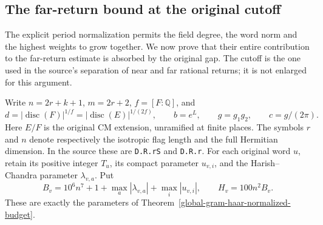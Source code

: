 \subsection{The far-return bound at the original cutoff}
\label{global-gram-far-absorption-section}

The explicit period normalization permits the field degree, the word
norm and the highest weights to grow together.  We now prove that their
entire contribution to the far-return estimate is absorbed by the
original gap.  The cutoff is the one used in the source's separation
of near and far rational returns; it is not enlarged for this argument.

Write $n=2r+k+1$, $m=2r+2$, $f=[F:\mathbb Q]$, and
\[
 d=|\operatorname{disc}(F)|^{1/f}
   =|\operatorname{disc}(E)|^{1/(2f)},\qquad
 b=e^L,\qquad g=g_1g_2,\qquad c=g/(2\pi).
\]
Here $E/F$ is the original CM extension, unramified at finite places.
The symbols $r$ and $n$ denote respectively the isotropic flag length
and the full Hermitian dimension.  In the source these are
\texttt{D.R.rS} and \texttt{D.R.r}.  For each original word $u$,
retain its positive integer $T_u$, its compact parameter $u_{v,i}$,
and the Harish--Chandra parameter $\lambda_{v,a}$.  Put
\[
 B_v=10^6n^7+1+\max_a|\lambda_{v,a}|+\max_i|u_{v,i}|,
 \qquad H_v=100n^2B_v.
\]
These are exactly the parameters of
Theorem~\ref{global-gram-haar-normalized-budget}.

